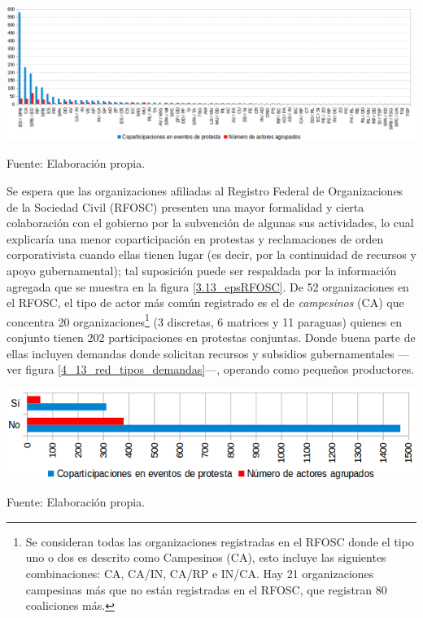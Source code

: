 \documentclass[letterpaper, 11pt]{book}
\theoremstyle{definition}
\theoremstyle{remark}
\begin{document}
\begin{minipage}{\linewidth}
\centering
{} \label{3.12_epsTipos}
\hspace{-2em}\includegraphics[scale=0.4]{img/3.12_epsTipos.png}
\par\bigskip
\small Fuente: Elaboración propia.
\end{minipage}\bigskip


Se espera que las organizaciones afiliadas al Registro Federal de Organizaciones de la Sociedad Civil (RFOSC) presenten una mayor formalidad y cierta colaboración con el gobierno por la subvención de algunas sus actividades, lo cual explicaría una menor coparticipación en protestas y reclamaciones de orden corporativista cuando ellas tienen lugar (es decir, por la continuidad de recursos y apoyo gubernamental); tal suposición puede ser respaldada por la información agregada que se muestra en la figura \ref{3.13_epsRFOSC}. 
De 52 organizaciones en el RFOSC, el tipo de actor más común registrado es el de \emph{campesinos} (CA) que concentra 20 organizaciones\footnote{
    Se consideran todas las organizaciones registradas en el RFOSC donde el tipo uno o dos es descrito como Campesinos (CA), esto incluye las siguientes combinaciones: CA, CA/IN, CA/RP e IN/CA. Hay 21 organizaciones campesinas más que no están registradas en el RFOSC, que registran 80 coaliciones más.
} 
(3 discretas, 6 matrices y 11 paraguas) quienes en conjunto tienen 202 participaciones en protestas conjuntas. 
Donde buena parte de ellas incluyen demandas donde solicitan recursos y subsidios gubernamentales ---ver figura \ref{4_13_red_tipos_demandas}---, operando como pequeños productores.


\begin{minipage}{\linewidth}
\centering
{} \label{3.13_epsRFOSC}
\includegraphics[scale=0.52]{img/3.13_epsRFOSC.png}
\par\bigskip
\small Fuente: Elaboración propia.
\end{minipage}\bigskip
\end{document}
